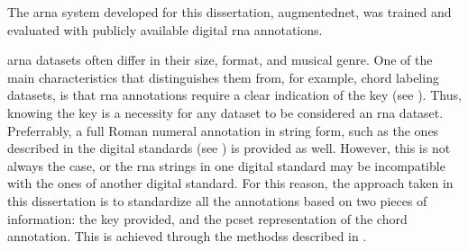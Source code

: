
The \gls{arna} system developed for this dissertation,
\gls{augmentednet}, was trained and evaluated with publicly
available digital \gls{rna} annotations. 

\gls{arna} datasets often  differ in their size, format, and
musical genre. One of the main characteristics that
distinguishes them from, for example, chord labeling
datasets, is that \gls{rna} annotations require a clear
indication of the key (see ). Thus,
knowing the key is a necessity for any dataset to be
considered an \gls{rna} dataset. Preferrably, a full Roman
numeral annotation in string form, such as the ones
described in the digital standards (see
) is provided as well.
However, this is not always the case, or the \gls{rna}
strings in one digital standard may be incompatible with the
ones of another digital standard. For this reason, the
approach taken in this dissertation is to standardize all
the annotations based on two pieces of information: the key
provided, and the \gls{pcset} representation of the chord
annotation. This is achieved through the methodss described
in .


